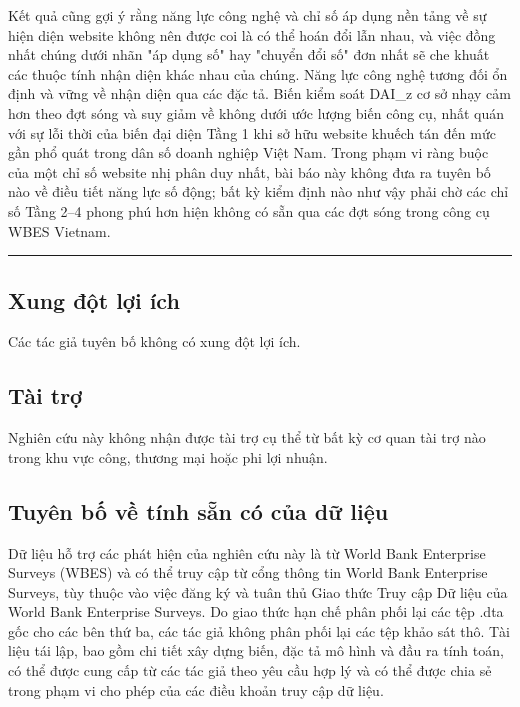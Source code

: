 \documentclass[12pt,a4paper]{article}
\begin{document}
Kết quả cũng gợi ý rằng năng lực công nghệ và chỉ số áp dụng nền tảng về
sự hiện diện website không nên được coi là có thể hoán đổi lẫn nhau, và
việc đồng nhất chúng dưới nhãn "áp dụng số" hay "chuyển đổi số" đơn nhất
sẽ che khuất các thuộc tính nhận diện khác nhau của chúng. Năng lực công
nghệ tương đối ổn định và vững về nhận diện qua các đặc tả. Biến kiểm
soát DAI\_z cơ sở nhạy cảm hơn theo đợt sóng và suy giảm về không dưới
ước lượng biến công cụ, nhất quán với sự lỗi thời của biến đại diện Tầng
1 khi sở hữu website khuếch tán đến mức gần phổ quát trong dân số doanh
nghiệp Việt Nam. Trong phạm vi ràng buộc của một chỉ số website nhị phân
duy nhất, bài báo này không đưa ra tuyên bố nào về điều tiết năng lực số
động; bất kỳ kiểm định nào như vậy phải chờ các chỉ số Tầng 2--4 phong
phú hơn hiện không có sẵn qua các đợt sóng trong công cụ WBES Vietnam.

\begin{center}\rule{0.5\linewidth}{0.5pt}\end{center}

\hypertarget{xung-ux111ux1ed9t-lux1ee3i-uxedch}{%
\subsection{Xung đột lợi ích}\label{xung-ux111ux1ed9t-lux1ee3i-uxedch}}

Các tác giả tuyên bố không có xung đột lợi ích.

\hypertarget{tuxe0i-trux1ee3}{%
\subsection{Tài trợ}\label{tuxe0i-trux1ee3}}

Nghiên cứu này không nhận được tài trợ cụ thể từ bất kỳ cơ quan tài trợ
nào trong khu vực công, thương mại hoặc phi lợi nhuận.

\hypertarget{tuyuxean-bux1ed1-vux1ec1-tuxednh-sux1eb5n-cuxf3-cux1ee7a-dux1eef-liux1ec7u}{%
\subsection{Tuyên bố về tính sẵn có của dữ
liệu}\label{tuyuxean-bux1ed1-vux1ec1-tuxednh-sux1eb5n-cuxf3-cux1ee7a-dux1eef-liux1ec7u}}

Dữ liệu hỗ trợ các phát hiện của nghiên cứu này là từ World Bank
Enterprise Surveys (WBES) và có thể truy cập từ cổng thông tin World
Bank Enterprise Surveys, tùy thuộc vào việc đăng ký và tuân thủ Giao
thức Truy cập Dữ liệu của World Bank Enterprise Surveys. Do giao thức
hạn chế phân phối lại các tệp .dta gốc cho các bên thứ ba, các tác giả
không phân phối lại các tệp khảo sát thô. Tài liệu tái lập, bao gồm chi
tiết xây dựng biến, đặc tả mô hình và đầu ra tính toán, có thể được cung
cấp từ các tác giả theo yêu cầu hợp lý và có thể được chia sẻ trong phạm
vi cho phép của các điều khoản truy cập dữ liệu.
\end{document}
